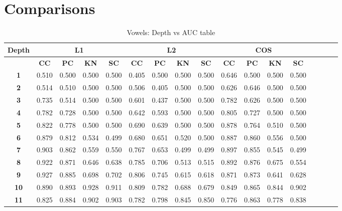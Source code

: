 \section{Comparisons}
\label{sec:comparisons}

\begin{table*}[!t]
\caption{Vowels: Depth vs AUC table}
\label{comparisons:vowels}
\centering
\begin{tabular}{|c|c|c|c|c|c|c|c|c|c|c|c|c|c|c|c|c|}
\hline
\bfseries Depth & \multicolumn{4}{c|}{\textbf{L1}} & \multicolumn{4}{c|}{\textbf{L2}} & \multicolumn{4}{c|}{\textbf{COS}} \\
\hline
\bfseries  & \bfseries CC & \bfseries PC & \bfseries KN & \bfseries SC & \bfseries CC & \bfseries PC & \bfseries KN & \bfseries SC & \bfseries CC & \bfseries PC & \bfseries KN & \bfseries SC \\
\hline
\bfseries 1 & 0.510 & 0.500 & 0.500 & 0.500 & 0.405 & 0.500 & 0.500 & 0.500 & 0.646 & 0.500 & 0.500 & 0.500 \\
\hline
\bfseries 2 & 0.514 & 0.510 & 0.500 & 0.500 & 0.506 & 0.405 & 0.500 & 0.500 & 0.626 & 0.646 & 0.500 & 0.500 \\
\hline
\bfseries 3 & 0.735 & 0.514 & 0.500 & 0.500 & 0.601 & 0.437 & 0.500 & 0.500 & 0.782 & 0.626 & 0.500 & 0.500 \\
\hline
\bfseries 4 & 0.782 & 0.728 & 0.500 & 0.500 & 0.642 & 0.593 & 0.500 & 0.500 & 0.805 & 0.727 & 0.500 & 0.500 \\
\hline
\bfseries 5 & 0.822 & 0.778 & 0.500 & 0.500 & 0.690 & 0.639 & 0.500 & 0.500 & 0.878 & 0.764 & 0.510 & 0.500 \\
\hline
\bfseries 6 & 0.879 & 0.812 & 0.534 & 0.499 & 0.680 & 0.651 & 0.520 & 0.500 & 0.887 & 0.860 & 0.556 & 0.500 \\
\hline
\bfseries 7 & 0.903 & 0.862 & 0.559 & 0.550 & 0.767 & 0.653 & 0.499 & 0.499 & 0.897 & 0.855 & 0.545 & 0.499 \\
\hline
\bfseries 8 & 0.922 & 0.871 & 0.646 & 0.638 & 0.785 & 0.706 & 0.513 & 0.515 & 0.892 & 0.876 & 0.675 & 0.554 \\
\hline
\bfseries 9 & 0.927 & 0.885 & 0.698 & 0.702 & 0.806 & 0.745 & 0.615 & 0.618 & 0.871 & 0.873 & 0.641 & 0.628 \\
\hline
\bfseries 10 & 0.890 & 0.893 & 0.928 & 0.911 & 0.809 & 0.782 & 0.688 & 0.679 & 0.849 & 0.865 & 0.844 & 0.902 \\
\hline
\bfseries 11 & 0.825 & 0.884 & 0.902 & 0.903 & 0.782 & 0.798 & 0.845 & 0.850 & 0.776 & 0.863 & 0.778 & 0.838 \\

\end{tabular}
\end{table*}
